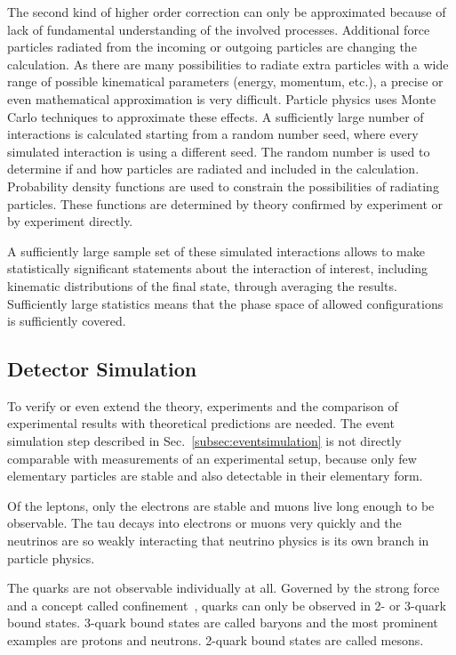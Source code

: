 \documentclass{wscpaperproc}
\theoremstyle{wsc}
\begin{document}
The second kind of higher order correction can only be approximated because of lack of fundamental understanding of the involved processes. Additional force particles radiated from the incoming or outgoing particles are changing the calculation. As there are many possibilities to radiate extra particles with a wide range of possible kinematical parameters (energy, momentum, etc.), a precise or even mathematical approximation is very difficult. Particle physics uses Monte Carlo techniques to approximate these effects. A sufficiently large number of interactions is calculated starting from a random number seed, where every simulated interaction is using a different seed. The random number is used to determine if and how particles are radiated and included in the calculation. Probability density functions are used to constrain the possibilities of radiating particles. These functions are determined by theory confirmed by experiment or by experiment directly.

A sufficiently large sample set of these simulated interactions allows to make statistically significant statements about the interaction of interest, including kinematic distributions of the final state, through averaging the results. Sufficiently large statistics means that the phase space of allowed configurations is sufficiently covered.

\subsection{Detector Simulation} 
\label{subsec:detectorsimulation}

To verify or even extend the theory, experiments and the comparison of experimental results with theoretical predictions are needed. The event simulation step described in Sec.~\ref{subsec:eventsimulation} is not directly comparable with measurements of an experimental setup, because only few elementary particles are stable and also detectable in their elementary form.

Of the leptons, only the electrons are stable and muons live long enough to be observable. The tau decays into electrons or muons very quickly and the neutrinos are so weakly interacting that neutrino physics is its own branch in particle physics. 

The quarks are not observable individually at all. Governed by the strong force and a concept called confinement~, quarks can only be observed in 2- or 3-quark bound states. 3-quark bound states are called baryons and the most prominent examples are protons and neutrons. 2-quark bound states are called mesons. 
\end{document}
